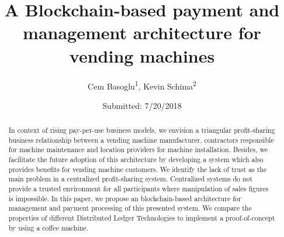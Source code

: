 \documentclass[twocolumn,fleqn,runningheads]{template_files/svjour2}
\begin{document}
\title{A Blockchain-based payment and management architecture for vending machines}

\author{Cem Basoglu\textsuperscript{1}, Kevin Schima\textsuperscript{2}}


\date{Submitted: 7/20/2018}

\maketitle

\begin{abstract}
In context of rising pay-per-use business models, we envision a triangular profit-sharing business relationship between a vending machine manufacturer, contractors responsible for machine maintenance and location providers for machine installation. Besides, we facilitate the future adoption of this architecture by developing a system which also provides benefits for vending machine customers. We identify the lack of trust as the main problem in a centralized profit-sharing system. 
Centralized systems do not provide a trusted environment for all participants where manipulation of sales figures is impossible. 
In this paper, we propose an blockchain-based architecture for management and payment processing of this presented system. We compare the properties of different Distributed Ledger Technologies to implement a proof-of-concept by using a coffee machine.
\end{abstract}











%
\end{document}
